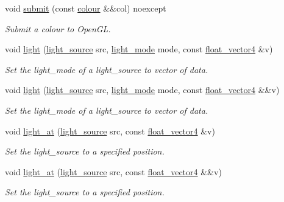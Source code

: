 \begin{DoxyCompactItemize}
void \hyperlink{namespaceglpp_aec91ff4a18d3b9693114f8774bd9c561}{submit} (const \hyperlink{classglpp_1_1colour}{colour} \&\&col) noexcept
\begin{DoxyCompactList}\small\item\em Submit a colour to Open\+GL. \end{DoxyCompactList}\item 
void \hyperlink{namespaceglpp_a1452c24e9a69623ab7646cd9d18f0146}{light} (\hyperlink{namespaceglpp_a3b61e78dfb4271d2841ea4a660c36e2d}{light\+\_\+source} src, \hyperlink{namespaceglpp_a8dc751394a1cf6601ba24c90da01f3a9}{light\+\_\+mode} mode, const \hyperlink{namespaceglpp_ab4a3d7b8ed8e2e4810006eef5213a460}{float\+\_\+vector4} \&v)
\begin{DoxyCompactList}\small\item\em Set the light\+\_\+mode of a light\+\_\+source to vector of data. \end{DoxyCompactList}\item 
void \hyperlink{namespaceglpp_a68700404bd7ed7cb77df9f5285287a1c}{light} (\hyperlink{namespaceglpp_a3b61e78dfb4271d2841ea4a660c36e2d}{light\+\_\+source} src, \hyperlink{namespaceglpp_a8dc751394a1cf6601ba24c90da01f3a9}{light\+\_\+mode} mode, const \hyperlink{namespaceglpp_ab4a3d7b8ed8e2e4810006eef5213a460}{float\+\_\+vector4} \&\&v)
\begin{DoxyCompactList}\small\item\em Set the light\+\_\+mode of a light\+\_\+source to vector of data. \end{DoxyCompactList}\item 
void \hyperlink{namespaceglpp_a5bf797d859522ff35c7cb60546c0955e}{light\+\_\+at} (\hyperlink{namespaceglpp_a3b61e78dfb4271d2841ea4a660c36e2d}{light\+\_\+source} src, const \hyperlink{namespaceglpp_ab4a3d7b8ed8e2e4810006eef5213a460}{float\+\_\+vector4} \&v)
\begin{DoxyCompactList}\small\item\em Set the light\+\_\+source to a specified position. \end{DoxyCompactList}\item 
void \hyperlink{namespaceglpp_a326d5aae60ec28913e36ebba634f662f}{light\+\_\+at} (\hyperlink{namespaceglpp_a3b61e78dfb4271d2841ea4a660c36e2d}{light\+\_\+source} src, const \hyperlink{namespaceglpp_ab4a3d7b8ed8e2e4810006eef5213a460}{float\+\_\+vector4} \&\&v)
\begin{DoxyCompactList}\small\item\em Set the light\+\_\+source to a specified position. \end{DoxyCompactList}\item 

\end{DoxyCompactItemize}
